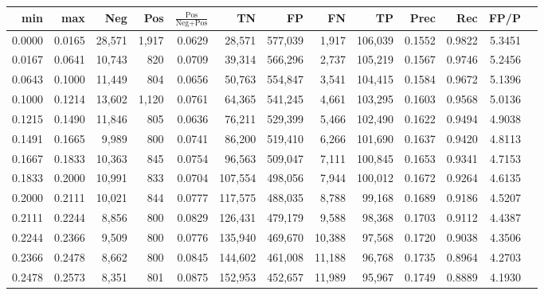 \begin{tabular}{rrrrrrrrrrrrr}
\toprule
   min &    max &    Neg &   Pos & $\frac{\text{Pos}}{\text{Neg}+\text{Pos}}$ &      TN &      FP &      FN &      TP &   Prec &    Rec &   FP/P \\
\midrule
0.0000 & 0.0165 & 28,571 & 1,917 &                                     0.0629 &  28,571 & 577,039 &   1,917 & 106,039 & 0.1552 & 0.9822 & 5.3451 \\
0.0167 & 0.0641 & 10,743 &   820 &                                     0.0709 &  39,314 & 566,296 &   2,737 & 105,219 & 0.1567 & 0.9746 & 5.2456 \\
0.0643 & 0.1000 & 11,449 &   804 &                                     0.0656 &  50,763 & 554,847 &   3,541 & 104,415 & 0.1584 & 0.9672 & 5.1396 \\
0.1000 & 0.1214 & 13,602 & 1,120 &                                     0.0761 &  64,365 & 541,245 &   4,661 & 103,295 & 0.1603 & 0.9568 & 5.0136 \\
0.1215 & 0.1490 & 11,846 &   805 &                                     0.0636 &  76,211 & 529,399 &   5,466 & 102,490 & 0.1622 & 0.9494 & 4.9038 \\
0.1491 & 0.1665 &  9,989 &   800 &                                     0.0741 &  86,200 & 519,410 &   6,266 & 101,690 & 0.1637 & 0.9420 & 4.8113 \\
0.1667 & 0.1833 & 10,363 &   845 &                                     0.0754 &  96,563 & 509,047 &   7,111 & 100,845 & 0.1653 & 0.9341 & 4.7153 \\
0.1833 & 0.2000 & 10,991 &   833 &                                     0.0704 & 107,554 & 498,056 &   7,944 & 100,012 & 0.1672 & 0.9264 & 4.6135 \\
0.2000 & 0.2111 & 10,021 &   844 &                                     0.0777 & 117,575 & 488,035 &   8,788 &  99,168 & 0.1689 & 0.9186 & 4.5207 \\
0.2111 & 0.2244 &  8,856 &   800 &                                     0.0829 & 126,431 & 479,179 &   9,588 &  98,368 & 0.1703 & 0.9112 & 4.4387 \\
0.2244 & 0.2366 &  9,509 &   800 &                                     0.0776 & 135,940 & 469,670 &  10,388 &  97,568 & 0.1720 & 0.9038 & 4.3506 \\
0.2366 & 0.2478 &  8,662 &   800 &                                     0.0845 & 144,602 & 461,008 &  11,188 &  96,768 & 0.1735 & 0.8964 & 4.2703 \\
0.2478 & 0.2573 &  8,351 &   801 &                                     0.0875 & 152,953 & 452,657 &  11,989 &  95,967 & 0.1749 & 0.8889 & 4.1930 \\

\end{tabular}
